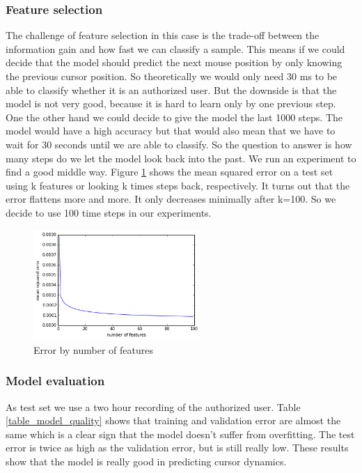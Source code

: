\documentclass[conference]{IEEEtran}
\begin{document}
\subsubsection{Feature selection}

The challenge of feature selection in this case is the trade-off between the information gain and how fast we can classify a sample. This means if we could decide that the model should predict the next mouse position by only knowing the previous cursor position. So theoretically we would only need 30 ms to be able to classify whether it is an authorized user. But the downside is that the model is not very good, because it is hard to learn only by one previous step. One the other hand we could decide to give the model the last 1000 steps. The model would have a high accuracy but that would also mean that we have to wait for 30 seconds until we are able to classify. So the question to answer is how many steps do we let the model look back into the past. We run an experiment to find a good middle way. Figure \ref{fig_features} shows the mean squared error on a test set using k features or looking k times steps back, respectively. It turns out that the error flattens more and more. It only decreases minimally after k=100. So we decide to use 100 time steps in our experiments.

\begin{figure}[!t]
\centering
\includegraphics[width=2.5in]{img/error_features.png}
\caption{Error by number of features}
\label{fig_features}
\end{figure}

\subsubsection{Model evaluation}
As test set we use a two hour recording of the authorized user. Table \ref{table_model_quality} shows that training and validation error are almost the same which is a clear sign that the model doesn't suffer from overfitting. The test error is twice as high as the validation error, but is still really low. These results show that the model is really good in predicting cursor dynamics.
\end{document}
